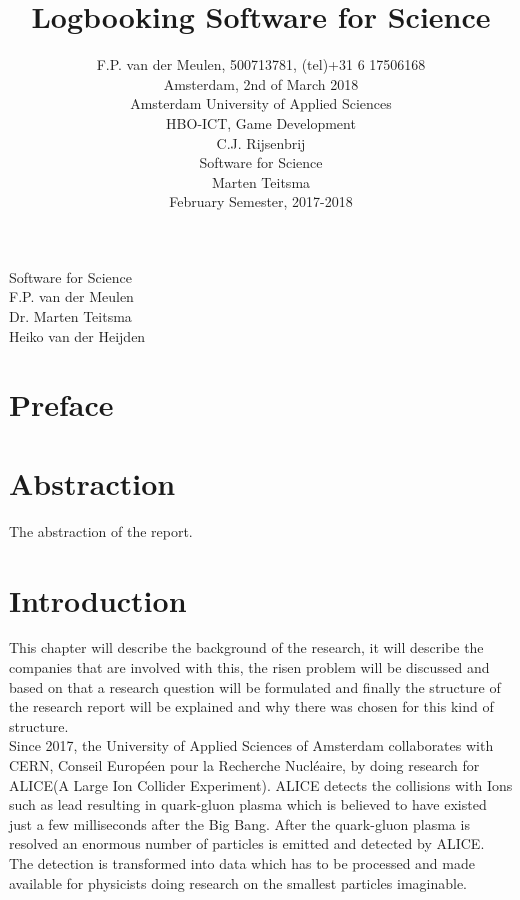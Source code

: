 \documentclass[paper=a4, fontsize=11pt,twoside]{scrartcl}	%
\title{Logbooking Software for Science}
\author{
		F.P. van der Meulen, 500713781, (tel)+31 6 17506168\\
		Amsterdam, 2nd of March 2018\\	
		Amsterdam University of Applied Sciences\\
		HBO-ICT, Game Development\\
		C.J. Rijsenbrij\\	
		Software for Science\\
		Marten Teitsma\\
		February Semester, 2017-2018\\
}
\makeatletter
\def\printtitle{%
    {\centering \@title\par}}
\def\printauthor{%
    {\centering \large \@author}}
\makeatother
\begin{document}
\thispagestyle{empty}		%


\printtitle
Software for Science\\
F.P. van der Meulen \\
Dr. Marten Teitsma\\
Heiko van der Heijden

\newpage 
\printtitle
\printauthor

\newpage



\newpage
\tableofcontents

\newpage
\section{Preface}

\section{Abstraction}
The abstraction of the report.
\newpage
\section{Introduction}
This chapter will describe the background of the research, it will describe the companies that are involved with this, the risen problem will be discussed and based on that a research question will be formulated and finally the structure of the research report will be explained and why there was chosen for this kind of structure. \\

Since 2017, the University of Applied Sciences of Amsterdam collaborates with CERN, Conseil Européen pour la Recherche Nucléaire, by doing research for ALICE(A Large Ion Collider Experiment). ALICE detects the collisions with Ions such as lead resulting in quark-gluon plasma which is believed to have existed just a few milliseconds after the Big Bang. After the quark-gluon plasma is resolved an enormous number of particles is emitted and detected by ALICE. The  detection  is  transformed  into  data  which  has  to  be  processed  and  made available for physicists doing research on the smallest particles imaginable.  
\end{document}
